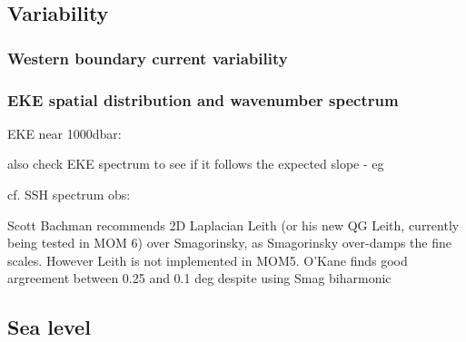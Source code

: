 \documentclass[11pt]{article}
\begin{document}
\subsection{Variability}
\citet{DanabasogluYeagerKimBehrensBentsenBiBiastochBleckBoning2016a}
\subsubsection{Western boundary current variability}
\subsubsection{EKE spatial distribution and wavenumber spectrum}

EKE near 1000dbar: \citet{OllitraultColindeVerdiere2014a}

also check EKE spectrum to see if it follows the expected slope - eg \citet{CapetMcWilliamsMolemakerShchepetkin2008a}

cf. SSH spectrum obs: \citet{XuFu2011a,XuFu2012a}
%

Scott Bachman recommends 2D Laplacian Leith (or his new QG Leith, currently being tested in MOM 6) over Smagorinsky, as Smagorinsky over-damps the fine scales. 
However Leith is not implemented in MOM5.
O'Kane finds good argreement between 0.25 and 0.1 deg despite using Smag biharmonic

\subsection{Sea level}

\citet{GriffiesYinDurackGoddardBatesBehrensBentsenBiBiastoch2014a}
\end{document}
